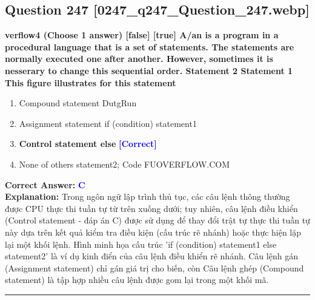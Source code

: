 \documentclass[11pt,a4paper]{article}
\begin{document}
\begin{minipage}{\textwidth}
\subsection*{Question 247 \quad \footnotesize{[0247\_q247\_Question\_247.webp]}}
\noindent \textbf{verflow4 (Choose 1 answer) [false] [true] A/an  is a program in a procedural language that is a set of statements. The statements are normally executed one after another. However, sometimes it is nesserary to change this sequential order. Statement 2 Statement 1 This figure illustrates for this statement}

\begin{enumerate}[label=\Alph*.]
    \item Compound statement DutgRun
    \item Assignment statement if (condition) statement1
    \item \textbf{Control statement else} \hfill \textcolor{blue}{\textbf{[Correct]}}
    \item None of others statement2; Code FUOVERFLOW.COM
\end{enumerate}

\noindent \textbf{Correct Answer:} \textcolor{blue}{\textbf{C}} \\[2pt]
\noindent \textbf{Explanation:} Trong ngôn ngữ lập trình thủ tục, các câu lệnh thông thường được CPU thực thi tuần tự từ trên xuống dưới; tuy nhiên, câu lệnh điều khiển (Control statement - đáp án C) được sử dụng để thay đổi trật tự thực thi tuần tự này dựa trên kết quả kiểm tra điều kiện (cấu trúc rẽ nhánh) hoặc thực hiện lặp lại một khối lệnh. Hình minh họa cấu trúc 'if (condition) statement1 else statement2' là ví dụ kinh điển của câu lệnh điều khiển rẽ nhánh. Câu lệnh gán (Assignment statement) chỉ gán giá trị cho biến, còn Câu lệnh ghép (Compound statement) là tập hợp nhiều câu lệnh được gom lại trong một khối mã.

\par\vspace{0.3cm}
\hrule
\vspace{0.3cm}
\end{minipage}
\end{document}
